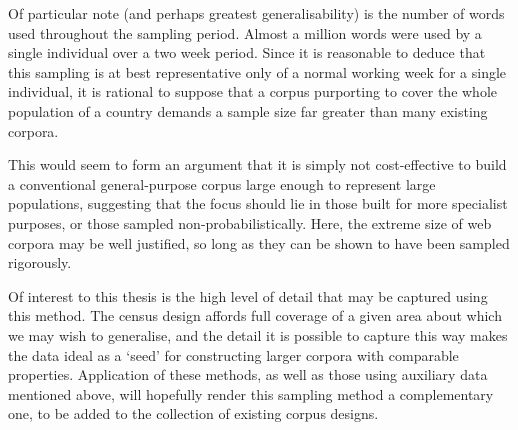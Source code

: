 Of particular note (and perhaps greatest generalisability) is the number of words used throughout the sampling period.  Almost a million words were used by a single individual over a two week period.  Since it is reasonable to deduce that this sampling is at best representative only of a normal working week for a single individual, it is rational to suppose that a corpus purporting to cover the whole population of a country demands a sample size far greater than many existing corpora.


This would seem to form an argument that it is simply not cost-effective to build a conventional general-purpose corpus large enough to represent large populations, suggesting that the focus should lie in those built for more specialist purposes, or those sampled non-probabilistically.  Here, the extreme size of web corpora may be well justified, so long as they can be shown to have been sampled rigorously.


Of interest to this thesis is the high level of detail that may be captured using this method.  The census design affords full coverage of a given area about which we may wish to generalise, and the detail it is possible to capture this way makes the data ideal as a `seed' for constructing larger corpora with comparable properties.  Application of these methods, as well as those using auxiliary data mentioned above, will hopefully render this sampling method a complementary one, to be added to the collection of existing corpus designs.





